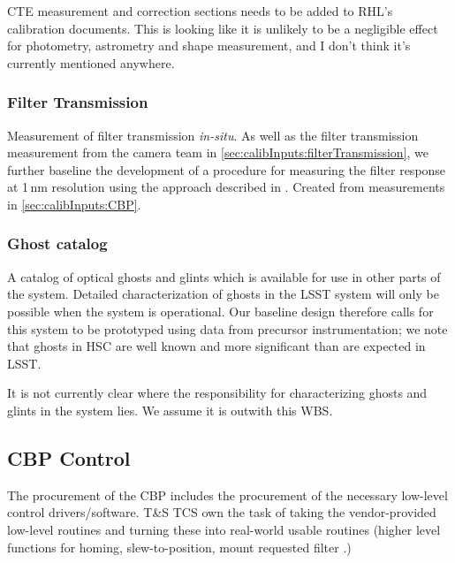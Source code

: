 \begin{note}
	CTE measurement and correction sections needs to be added to RHL's calibration documents. This is looking like it is unlikely to be a negligible effect for photometry, astrometry and shape measurement, and I don't think it's currently mentioned anywhere.
\end{note}


\subsubsection{Filter Transmission}\label{calibProducts:filterTransmission}
Measurement of filter transmission \emph{in-situ}. As well as the filter transmission measurement from the camera team in \ref{sec:calibInputs:filterTransmission}, we further baseline the development of a procedure for measuring the filter response at 1\,nm resolution using the approach described in \cite{Lupton15}.
\alg Created from measurements in \secsymbol\ref{sec:calibInputs:CBP}. 


\subsubsection{Ghost catalog}\label{calibProducts:GhostCatalog}
A catalog of optical ghosts and glints which is available for use in other parts of the system. Detailed characterization of ghosts in the LSST system will only be possible when the system is operational. Our baseline design therefore calls for this system to be prototyped using data from precursor instrumentation; we note that ghosts in \eg HSC are well known and more significant than are expected in LSST.
\begin{note}
It is not currently clear where the responsibility for characterizing ghosts and glints in the system lies. We assume it is outwith this WBS.
\end{note}






\subsection{CBP Control}\label{CBP_control}
The procurement of the CBP includes the procurement of the necessary low-level control drivers/software. T\&S TCS own the task of taking the vendor-provided low-level routines and turning these into real-world usable routines (higher level functions for \eg homing, slew-to-position, mount requested filter \etc.)

